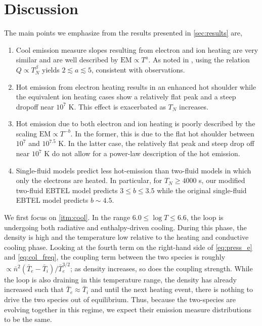 \documentclass[apj]{emulateapj}
\begin{document}
	\section{Discussion}
	\label{sec:discussion}
	\par The main points we emphasize from the results presented in \autoref{sec:results} are,
	\begin{enumerate}
		\item Cool emission measure slopes resulting from electron and ion heating are very similar and are well described by $\mathrm{EM}\propto T^a$. As noted in \citet{cargill_active_2014}, using the relation $Q\propto T_N^{\beta}$ yields $2\lesssim a\lesssim5$, consistent with observations.\label{itm:cool}
		\item Hot emission from electron heating results in an enhanced hot shoulder while the equivalent ion heating cases show a relatively flat peak and a steep dropoff near $10^7$ K. This effect is exacerbated as $T_N$ increases.\label{itm:hot}
		\item Hot emission due to both electron and ion heating is poorly described by the scaling $\mathrm{EM}\propto T^{-b}$. In the former, this is due to the flat hot shoulder between $10^7$ and $10^{7.5}$ K. In the latter case, the relatively flat peak and steep drop off near $10^7$ K do not allow for a power-law description of the hot emission.\label{itm:deriv}
		\item Single-fluid models predict less hot-emission than two-fluid models in which only the electrons are heated. In particular, for $T_N\ge4000$ s, our modified two-fluid EBTEL model predicts $3\le b\le3.5$ while the original single-fluid EBTEL model predicts $b\sim4.5$.\label{itm:histos}
	\end{enumerate}
	\par We first focus on \autoref{itm:cool}. In the range $6.0\le\log{T}\le6.6$, the loop is undergoing both radiative and enthalpy-driven cooling. During this phase, the density is high and the temperature low relative to the heating and conductive cooling phase. Looking at the fourth term on the right-hand side of \autoref{eq:press_e} and \autoref{eq:col_freq}, the coupling term between the two species is roughly $\propto\bar{n}^2(\bar{T}_e-\bar{T}_i)/\bar{T}_e^{3/2}$; as density increases, so does the coupling strength. While the loop is also draining in this temperature range, the density has already increased such that $\bar{T}_e\approx\bar{T}_i$ and until the next heating event, there is nothing to drive the two species out of equilibrium. Thus, because the two-species are evolving together in this regime, we expect their emission measure distributions to be the same.
\end{document}
